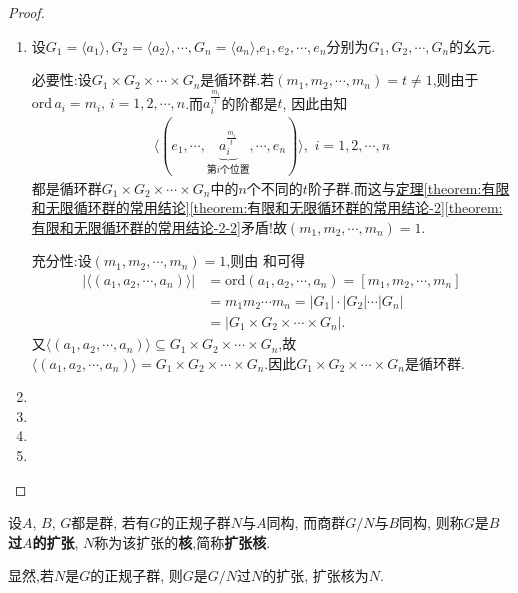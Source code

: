 \documentclass[../../main.tex]{subfiles}%
\begin{document}
\begin{proof}
\begin{enumerate}[(1)]
\item 设$G_1 = \langle a_1 \rangle,G_2 = \langle a_2 \rangle,\cdots ,G_n=\langle a_n \rangle$,$e_1,e_2,\cdots,e_n$分别为$G_1,G_2,\cdots,G_n$的幺元.

{\heiti 必要性:}设$G_1\times G_2\times\cdots\times G_n$是循环群.若$(m_1,m_2,\cdots,m_n)=t\ne1$,则由于$\text{ord}\,a_i=m_i,\,i=1,2,\cdots,n$.而$a_{i}^{\frac{m_i}{t}}$的阶都是$t$,
因此由知
\begin{align*}
\langle (e_1,\cdots ,\underset{\text{第}i\text{个位置}}{\underbrace{a_{i}^{\frac{m_i}{t}}}},\cdots ,e_n)\rangle ,\,\,i=1,2,\cdots ,n
\end{align*}
都是循环群$G_1\times G_2\times\cdots\times G_n$中的$n$个不同的$t$阶子群.而这与\hyperref[theorem:有限和无限循环群的常用结论-2-2]{定理\ref{theorem:有限和无限循环群的常用结论}\ref{theorem:有限和无限循环群的常用结论-2}\ref{theorem:有限和无限循环群的常用结论-2-2}}矛盾!故$(m_1,m_2,\cdots,m_n)=1$.

{\heiti 充分性:}设$(m_1,m_2,\cdots,m_n)=1$,则由
和可得
\begin{align*}
|\langle (a_1,a_2,\cdots ,a_n)\rangle |&=\mathrm{ord}(a_1,a_2,\cdots ,a_n)=[m_1,m_2,\cdots ,m_n]
\\
&=m_1m_2\cdots m_n=|G_1|\cdot |G_2|\cdots |G_n|
\\
&=|G_1\times G_2\times \cdots \times G_n|.
\end{align*}
又$\langle(a_1,a_2,\cdots,a_n)\rangle\subseteq G_1\times G_2\times\cdots\times G_n$,故$\langle(a_1,a_2,\cdots,a_n)\rangle=G_1\times G_2\times\cdots\times G_n$.因此$G_1\times G_2\times\cdots\times G_n$是循环群.

\item 

\item 

\item 

\item 
\end{enumerate}

\end{proof}

\begin{definition}
设$A$, $B$, $G$都是群, 若有$G$的正规子群$N$与$A$同构, 而商群$G/N$与$B$同构, 则称$G$是\textbf{$B$过$A$的扩张}, $N$称为该扩张的\textbf{核},简称\textbf{扩张核}.
\end{definition}
\begin{remark}
显然,若$N$是$G$的正规子群, 则$G$是$G/N$过$N$的扩张, 扩张核为$N$.
\end{remark}
\end{document}

